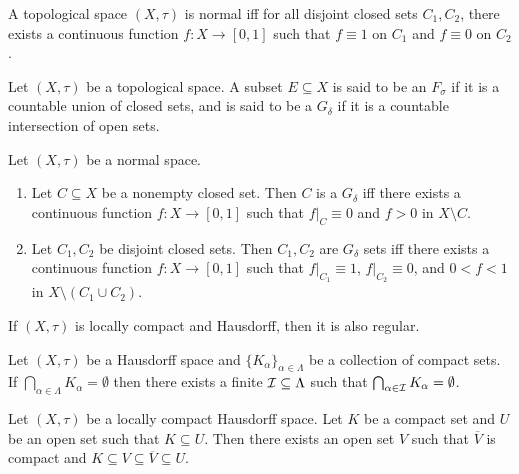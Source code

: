 \documentclass[screen]{techreport}
\numberwithin{equation}{section}
\begin{document}
\begin{theorem}\label{The:Urysohn}
	A topological space $(X,\tau)$ is normal iff for all disjoint closed sets $C_1,C_2$, there exists a continuous function $f:X \to [0,1]$ such that $f \equiv 1$ on $C_1$ and $f \equiv 0$ on $C_2$.
\end{theorem}

\begin{definition}\label{De:FsigmaGdelta}
	Let $(X,\tau)$ be a topological space.
	A subset $E \subseteq X$ is said to be an $F_\sigma$ if it is a countable union of closed sets, and is said to be a $G_\delta$ if it is a countable intersection of open sets.
\end{definition}

\begin{proposition}\label{Prop:GdeltaStrongerSeparation}
	Let $(X,\tau)$ be a normal space.
	\begin{enumerate}
		\item Let $C \subseteq X$ be a nonempty closed set.
		Then $C$ is a $G_\delta$ iff there exists a continuous function $f : X \to [0,1]$ such that $f|_C \equiv 0$ and $f > 0$ in $X \setminus C$.
		\item Let $C_1,C_2$ be disjoint closed sets.
		Then $C_1,C_2$ are $G_\delta$ sets iff there exists a continuous function $f: X \to [0,1]$ such that $f|_{C_1} \equiv 1$, $f|_{C_2} \equiv 0$, and $0 < f < 1$ in $X \setminus (C_1 \cup C_2)$.
	\end{enumerate}
\end{proposition}

\begin{lemma}\label{Lem:LocCompT2ImplyRegular}
	If $(X,\tau)$ is locally compact and Hausdorff, then it is also regular.
\end{lemma}

\begin{lemma}\label{Lem:T2CompactEmptyInterThenFinteEmptyInter}
	Let $(X,\tau)$ be a Hausdorff space and $\{K_\alpha\}_{\alpha \in \Lambda}$ be a collection of compact sets.
	If $\bigcap_{\alpha \in \Lambda} K_\alpha = \emptyset$ then there exists a finite $\mathcal{I} \subseteq \Lambda$ such that $\bigcap_{\alpha \in \mathcal{I}} K_\alpha = \emptyset$.
\end{lemma}

\begin{lemma}\label{Lem:LocCompT2ThenNeighborContainCompactClosure}
	Let $(X,\tau)$ be a locally compact Hausdorff space.
	Let $K$ be a compact set and $U$ be an open set such that $K \subseteq U$.
	Then there exists an open set $V$ such that $\overline{V}$ is compact and $K \subseteq V \subseteq \overline{V} \subseteq U$.
\end{lemma}
\end{document}
